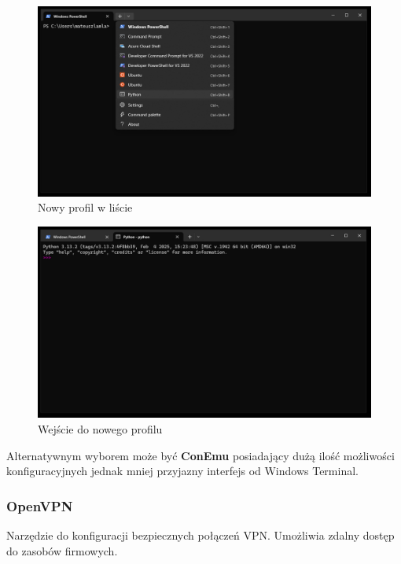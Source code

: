 \documentclass[0.82pt,a4paper]{article}
\begin{document}
    \begin{figure}[H]
        \centering
        \includegraphics[width=0.8\linewidth]{media/Windows Terminal/7_1nowy_profil_utworzony.PNG}
        \caption[]{Nowy profil w liście}
        \label{fig:terminal_nowy_profil}
    \end{figure}

    \begin{figure}[H]
        \centering
        \includegraphics[width=0.8\linewidth]{media/Windows Terminal/7_2_dzialajacy profil.PNG}
        \caption[]{Wejście do nowego profilu}
        \label{fig:terminal_nowy_profil_wejscie}
    \end{figure}
    
    Alternatywnym wyborem może być \textbf{ConEmu} posiadający dużą ilość możliwości konfiguracyjnych jednak mniej przyjazny interfejs od Windows Terminal.

\newpage
\subsubsection{OpenVPN}
    Narzędzie do konfiguracji bezpiecznych połączeń VPN. Umożliwia zdalny dostęp do zasobów firmowych.
    
\end{document}
